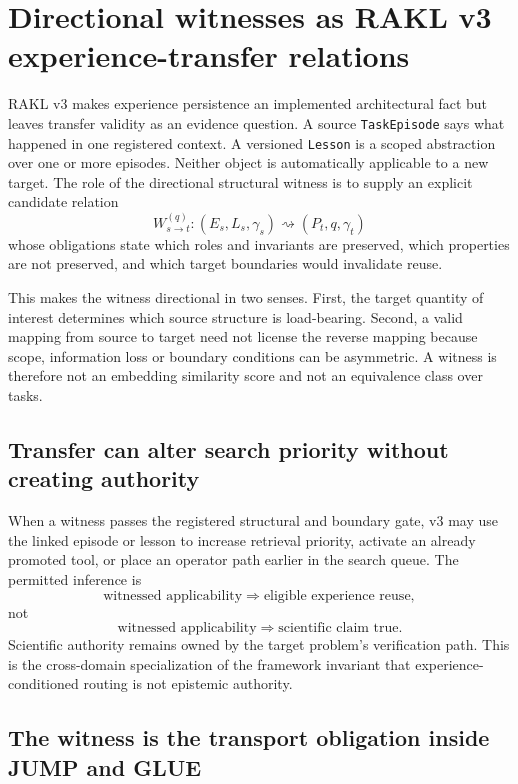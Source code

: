 \section{Directional witnesses as RAKL v3 experience-transfer relations}
\label{sec:v3-transfer}

RAKL v3 makes experience persistence an implemented architectural fact but leaves transfer validity as an evidence question. A source \texttt{TaskEpisode} says what happened in one registered context. A versioned \texttt{Lesson} is a scoped abstraction over one or more episodes. Neither object is automatically applicable to a new target. The role of the directional structural witness is to supply an explicit candidate relation
\[
W_{s\rightarrow t}^{(q)}:
(E_s,L_s,\gamma_s)
\rightsquigarrow
(P_t,q,\gamma_t)
\]
whose obligations state which roles and invariants are preserved, which properties are not preserved, and which target boundaries would invalidate reuse.

This makes the witness directional in two senses. First, the target quantity of interest determines which source structure is load-bearing. Second, a valid mapping from source to target need not license the reverse mapping because scope, information loss or boundary conditions can be asymmetric. A witness is therefore not an embedding similarity score and not an equivalence class over tasks.

\subsection{Transfer can alter search priority without creating authority}
When a witness passes the registered structural and boundary gate, v3 may use the linked episode or lesson to increase retrieval priority, activate an already promoted tool, or place an operator path earlier in the search queue. The permitted inference is
\[
\text{witnessed applicability}
\Rightarrow
\text{eligible experience reuse},
\]
not
\[
\text{witnessed applicability}
\Rightarrow
\text{scientific claim true}.
\]
Scientific authority remains owned by the target problem's verification path. This is the cross-domain specialization of the framework invariant that experience-conditioned routing is not epistemic authority.

\subsection{The witness is the transport obligation inside JUMP and GLUE}

